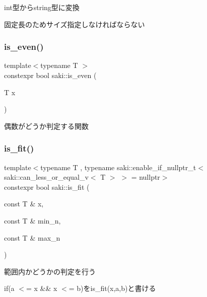 int型からstring型に変換 

固定長のためサイズ指定しなければならない \mbox{\label{namespacesaki_a7fa7e4ec89e948874e42926e91d6dd4e}} 
\subsubsection{\texorpdfstring{is\+\_\+even()}{is\_even()}}
{\footnotesize\ttfamily template$<$typename T $>$ \\
constexpr bool saki\+::is\+\_\+even (\begin{DoxyParamCaption}\item[{T}]{x }\end{DoxyParamCaption})}



偶数がどうか判定する関数 

\mbox{\label{namespacesaki_a45597d7382905409bada2316f78502fc}} 
\subsubsection{\texorpdfstring{is\+\_\+fit()}{is\_fit()}\hspace{0.1cm}{\footnotesize\ttfamily [1/2]}}
{\footnotesize\ttfamily template$<$typename T , typename saki\+::enable\+\_\+if\+\_\+nullptr\+\_\+t$<$ saki\+::can\+\_\+less\+\_\+or\+\_\+equal\+\_\+v$<$ T $>$ $>$  = nullptr$>$ \\
constexpr bool saki\+::is\+\_\+fit (\begin{DoxyParamCaption}\item[{const T \&}]{x,  }\item[{const T \&}]{min\+\_\+n,  }\item[{const T \&}]{max\+\_\+n }\end{DoxyParamCaption})}



範囲内かどうかの判定を行う 

if(a $<$= x \&\& x $<$= b)をis\+\_\+fit(x,a,b)と書ける \mbox{\label{namespacesaki_a09478d8cb01d75e93d34f884d7133dc9}} 
